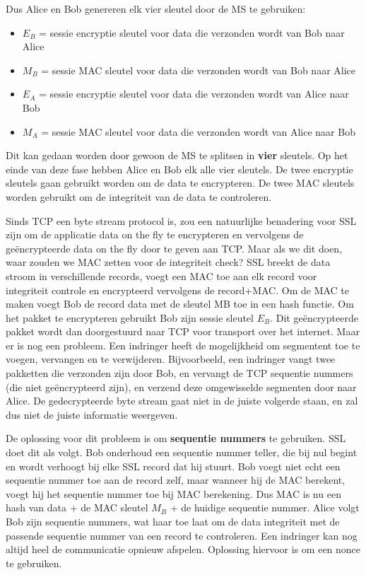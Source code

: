 \noindent Dus Alice en Bob genereren elk vier sleutel door de MS te gebruiken:
\begin{itemize}
\item $E_B$ = sessie encryptie sleutel voor data die verzonden wordt van Bob naar Alice
\item $M_B$ = sessie MAC sleutel voor data die verzonden wordt van Bob naar Alice
\item $E_A$ = sessie encryptie sleutel voor data die verzonden wordt van Alice naar Bob
\item $M_A$ = sessie MAC sleutel voor data die verzonden wordt van Alice naar Bob
\end{itemize}
Dit kan gedaan worden door gewoon de MS te splitsen in \textbf{vier} sleutels. Op het einde van deze fase hebben Alice en Bob elk alle vier sleutels. De twee encryptie sleutels gaan gebruikt worden om de data te encrypteren. De twee MAC sleutels worden gebruikt om de integriteit van de data te controleren.


Sinds TCP een byte stream protocol is, zou een natuurlijke benadering voor SSL zijn om de applicatie data on the fly te encrypteren en vervolgens de geëncrypteerde data on the fly door te geven aan TCP. Maar als we dit doen, waar zouden we MAC zetten voor de integriteit check?
SSL breekt de data stroom in verschillende records, voegt een MAC toe aan elk record voor integriteit controle en encrypteerd vervolgens de record+MAC. Om de MAC te maken voegt Bob de record data met de sleutel MB toe in een hash functie. Om het pakket te encrypteren gebruikt Bob zijn sessie sleutel $E_B$. Dit geëncrypteerde pakket wordt dan doorgestuurd naar TCP voor transport over het internet.
Maar er is nog een probleem. Een indringer heeft de mogelijkheid om segmentent toe te voegen, vervangen en te verwijderen. Bijvoorbeeld, een indringer vangt twee pakketten die verzonden zijn door Bob, en vervangt de TCP sequentie nummers (die niet geëncrypteerd zijn), en verzend deze omgewisselde segmenten door naar Alice.
De gedecrypteerde byte stream gaat niet in de juiste volgerde staan, en zal dus niet de juiste informatie weergeven.

De oplossing voor dit probleem is om \textbf{sequentie nummers} te gebruiken. SSL doet dit als volgt. Bob onderhoud een sequentie nummer teller, die bij nul begint en wordt verhoogt bij elke SSL record dat hij stuurt. Bob voegt niet echt een sequentie nummer toe aan de record zelf, maar wanneer hij de MAC berekent, voegt hij het sequentie nummer toe bij MAC berekening. Dus MAC is nu een hash van data + de MAC sleutel $M_B$ + de huidige sequentie nummer.
Alice volgt Bob zijn sequentie nummers, wat haar toe laat om de data integriteit met de passende sequentie nummer van een record te controleren.
Een indringer kan nog altijd heel de communicatie opnieuw afspelen. Oplossing hiervoor is om een nonce te gebruiken.

